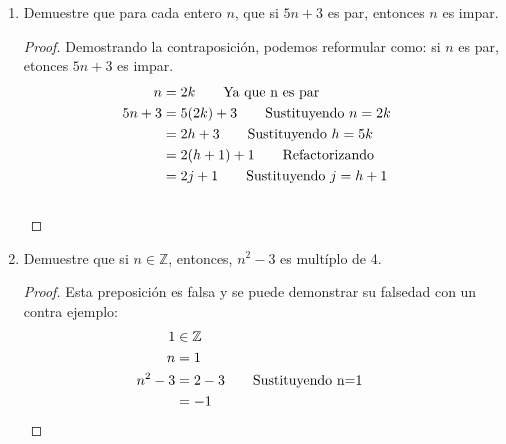 \documentclass[a4paper,10pt]{article}
\begin{document}
\begin{enumerate}
  \item Demuestre que para cada entero $n$, que si $5n + 3$ es par, entonces $n$ es impar.
    \begin{proof}
     Demostrando la contraposición, podemos reformular como: si $n$ es par, etonces $5n + 3$ es impar.
     \begin{align*}
        n &= 2k             \tag*{Ya que n es par}
        \\ 5n + 3 &= 5(2k) + 3     \tag*{Sustituyendo $n=2k$}
        \\ &= 2h + 3        \tag*{Sustituyendo $h=5k$}
        \\ &= 2(h+1) + 1    \tag*{Refactorizando}
        \\ &= 2j + 1        \tag*{Sustituyendo $j=h+1$}  
        \\ &&\qedhere
     \end{align*}
    \end{proof}
    
  \item Demuestre que si $n \in \mathbb{Z}$, entonces, $n^2 -3$ es multíplo de 4.
  \begin{proof}
    Esta preposición es falsa y se puede demonstrar su falsedad con un contra ejemplo:
    \begin{align*}
        1 &\in \mathbb{Z}
        \\ n &= 1
        \\ n^2 - 3 &= 2 - 3     \tag*{Sustituyendo n=1}
        \\ &= -1                &&\qedhere
    \end{align*}
  \end{proof}
\end{enumerate}
\end{document}
